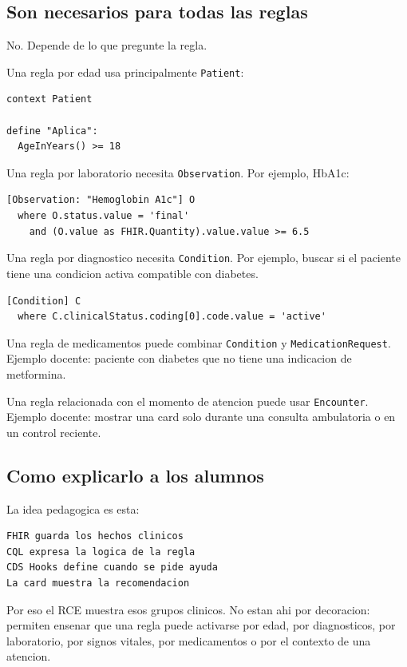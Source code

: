 \subsection{Son necesarios para todas las reglas}

No. Depende de lo que pregunte la regla.

Una regla por edad usa principalmente \texttt{Patient}:

\begin{lstlisting}
context Patient

define "Aplica":
  AgeInYears() >= 18
\end{lstlisting}

Una regla por laboratorio necesita \texttt{Observation}. Por ejemplo, HbA1c:

\begin{lstlisting}
[Observation: "Hemoglobin A1c"] O
  where O.status.value = 'final'
    and (O.value as FHIR.Quantity).value.value >= 6.5
\end{lstlisting}

Una regla por diagnostico necesita \texttt{Condition}. Por ejemplo, buscar si el
paciente tiene una condicion activa compatible con diabetes.

\begin{lstlisting}
[Condition] C
  where C.clinicalStatus.coding[0].code.value = 'active'
\end{lstlisting}

Una regla de medicamentos puede combinar \texttt{Condition} y
\texttt{MedicationRequest}. Ejemplo docente: paciente con diabetes que no tiene
una indicacion de metformina.

Una regla relacionada con el momento de atencion puede usar \texttt{Encounter}.
Ejemplo docente: mostrar una card solo durante una consulta ambulatoria o en un
control reciente.

\subsection{Como explicarlo a los alumnos}

La idea pedagogica es esta:

\begin{lstlisting}
FHIR guarda los hechos clinicos
CQL expresa la logica de la regla
CDS Hooks define cuando se pide ayuda
La card muestra la recomendacion
\end{lstlisting}

Por eso el RCE muestra esos grupos clinicos. No estan ahi por decoracion:
permiten ensenar que una regla puede activarse por edad, por diagnosticos, por
laboratorio, por signos vitales, por medicamentos o por el contexto de una
atencion.

